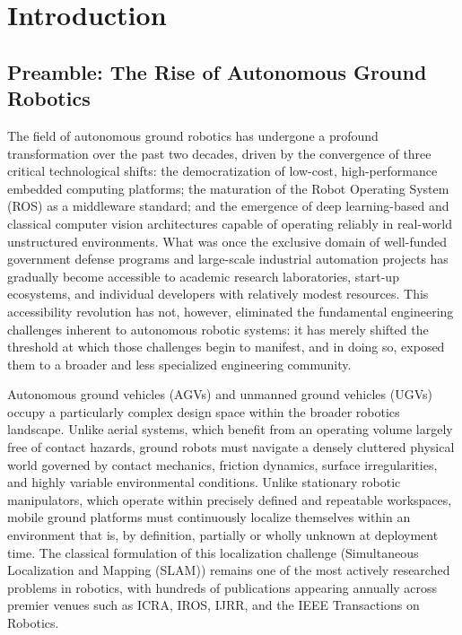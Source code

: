 \chapter{Introduction}
\label{ch:introduction}

\section{Preamble: The Rise of Autonomous Ground Robotics}

The field of autonomous ground robotics has undergone a profound transformation over the past two decades, driven by the convergence of three critical technological shifts: the democratization of low-cost, high-performance embedded computing platforms; the maturation of the Robot Operating System (ROS) as a middleware standard; and the emergence of deep learning-based and classical computer vision architectures capable of operating reliably in real-world unstructured environments. What was once the exclusive domain of well-funded government defense programs and large-scale industrial automation projects has gradually become accessible to academic research laboratories, start-up ecosystems, and individual developers with relatively modest resources. This accessibility revolution has not, however, eliminated the fundamental engineering challenges inherent to autonomous robotic systems: it has merely shifted the threshold at which those challenges begin to manifest, and in doing so, exposed them to a broader and less specialized engineering community.

Autonomous ground vehicles (AGVs) and unmanned ground vehicles (UGVs) occupy a particularly complex design space within the broader robotics landscape. Unlike aerial systems, which benefit from an operating volume largely free of contact hazards, ground robots must navigate a densely cluttered physical world governed by contact mechanics, friction dynamics, surface irregularities, and highly variable environmental conditions. Unlike stationary robotic manipulators, which operate within precisely defined and repeatable workspaces, mobile ground platforms must continuously localize themselves within an environment that is, by definition, partially or wholly unknown at deployment time. The classical formulation of this localization challenge (Simultaneous Localization and Mapping (SLAM)) remains one of the most actively researched problems in robotics, with hundreds of publications appearing annually across premier venues such as ICRA, IROS, IJRR, and the IEEE Transactions on Robotics.

